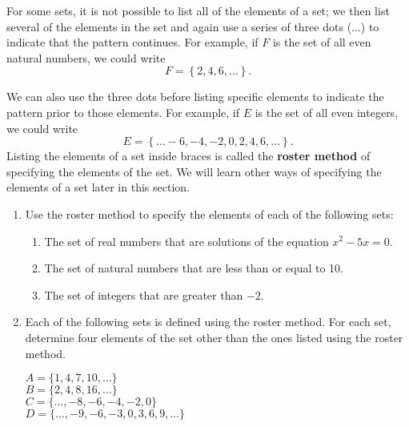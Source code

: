 \begin{previewactivity}
For some sets, it is not possible to list all of the elements of a set; we then list several of the elements in the set and again use a series of three dots ($ \ldots $) to indicate that the pattern continues.  For example, if  $F$  is the set of all even natural numbers, we could write
\[
F = \left\{ {2,4,6, \ldots } \right\}.
\]

We can also use the three dots before listing specific elements to indicate the pattern prior to those elements.  For example, if  $E$  is the set of all even integers, we could write
\[
E = \left\{ {\ldots -6, -4, -2, 0, 2,4,6, \ldots } \right\}.
\]
Listing the elements of a set inside braces is called the \textbf{roster method}
%
%
\label{sym:roster}%
 of specifying the elements of the set.  We will learn other ways of specifying the elements of a set later in this section.



\begin{enumerate}
  \item Use the roster method to specify the elements of each of the following sets:
\begin{enumerate}
\item The set of real numbers that are solutions of the equation $x^2 - 5x = 0$.
\item The set of natural numbers that are less than or equal to 10.
\item The set of integers that are greater than $-2$.
\end{enumerate}
  \item Each of the following sets is defined using the roster method.  For each set, determine four elements of the set other than the ones listed using the roster method.
\begin{multicols}{2}
$A = \{1, 4, 7, 10, \ldots \}$\\
$B = \{2, 4, 8, 16, \ldots \}$ \\
$C = \{ \ldots, -8, -6, -4, -2, 0 \}$ \\
$D = \{\ldots, -9, -6, -3, 0, 3, 6, 9, \ldots \}$
\end{multicols}
\end{enumerate}






\end{previewactivity}
